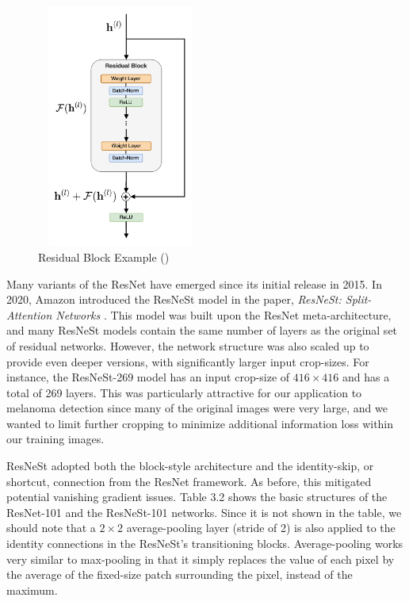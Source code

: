 \documentclass [MAS] {uclathes}
\begin{document}
\begin{figure}[h]
\centering
\includegraphics[height = 80mm, width= 55mm]{imgs/resblock.png}
\caption{Residual Block Example (\cite{resnet})}
\label{fig:res_block}
\end{figure}

Many variants of the ResNet have emerged since its initial release in 2015. In 2020, Amazon introduced the ResNeSt model in the paper, \textit{ResNeSt: Split-Attention Networks} \cite{resnest}. This model was built upon the ResNet meta-architecture, and many ResNeSt models contain the same number of layers as the original set of residual networks. However, the network structure was also scaled up to provide even deeper versions, with significantly larger input crop-sizes. For instance, the ResNeSt-269 model has an input crop-size of $416 \times 416$ and has a total of 269 layers. This was particularly attractive for our application to melanoma detection since many of the original images were very large, and we wanted to limit further cropping to minimize additional information loss within our training images.

ResNeSt adopted both the block-style architecture and the identity-skip, or shortcut, connection from the ResNet framework. As before, this mitigated potential vanishing gradient issues. Table 3.2 shows the basic structures of the ResNet-101 and the ResNeSt-101 networks. Since it is not shown in the table, we should note that a $2 \times 2$ average-pooling layer (stride of 2) is also applied to the identity connections in the ResNeSt's transitioning blocks. Average-pooling works very similar to max-pooling in that it simply replaces the value of each pixel by the average of the fixed-size patch surrounding the pixel, instead of the maximum. 
\end{document}
